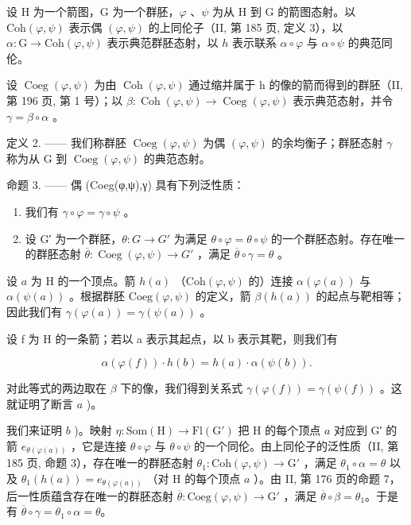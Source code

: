 设 H 为一个箭图，G 为一个群胚，\(\varphi\) 、\(\psi\) 为从 H 到 G 的箭图态射。以 \(\mathrm{Coh}(\varphi,\psi)\) 表示偶 \((\varphi,\psi)\) 的上同伦子（II, 第 185 页, 定义 3），以 \(\alpha\colon\mathrm{G}\to\mathrm{Coh}(\varphi,\psi)\) 表示典范群胚态射，以 \(h\) 表示联系 \(\alpha\circ\varphi\) 与 \(\alpha\circ\psi\) 的典范同伦。

设 \(\operatorname{Coeg}(\varphi,\psi)\) 为由 \(\operatorname{Coh}(\varphi,\psi)\) 通过缩并属于 h 的像的箭而得到的群胚（II, 第 196 页, 第 1 号）；以 \(\beta\colon\operatorname{Coh}(\varphi,\psi)\to\operatorname{Coeg}(\varphi,\psi)\) 表示典范态射，并令 \(\gamma=\beta\circ\alpha\) 。

定义 2. —— 我们称群胚 \(\operatorname{Coeg}(\varphi,\psi)\) 为偶 \((\varphi,\psi)\) 的余均衡子；群胚态射 \(\gamma\) 称为从 G 到 \(\operatorname{Coeg}(\varphi,\psi)\) 的典范态射。

命题 3. —— 偶 (Coeg(φ,ψ),γ) 具有下列泛性质：

\begin{enumerate}
\def\labelenumi{\alph{enumi})}
\item
  我们有 \(\gamma \circ \varphi = \gamma \circ \psi\) 。
\item
  设 G′ 为一个群胚，\(\theta\colon G\to G'\) 为满足 \(\theta\circ\varphi=\theta\circ\psi\) 的一个群胚态射。存在唯一的群胚态射 \(\overline{\theta}\colon\operatorname{Coeg}(\varphi,\psi)\to G'\) ，满足 \(\overline{\theta}\circ\gamma=\theta\) 。
\end{enumerate}

设 \(a\) 为 H 的一个顶点。箭 \(h(a)\) （\(\mathrm{Coh}(\varphi, \psi)\) 的）连接 \(\alpha(\varphi(a))\) 与 \(\alpha(\psi(a))\) 。根据群胚 \(\mathrm{Coeg}(\varphi, \psi)\) 的定义，箭 \(\beta(h(a))\) 的起点与靶相等；因此我们有 \(\gamma(\varphi(a)) = \gamma(\psi(a))\) 。

设 f 为 H 的一条箭；若以 a 表示其起点，以 b 表示其靶，则我们有

\[
\alpha (\varphi (f)) \cdot h (b) = h (a) \cdot \alpha (\psi (b)).
\]

对此等式的两边取在 \(\beta\) 下的像，我们得到关系式 \(\gamma(\varphi(f)) = \gamma(\psi(f))\) 。这就证明了断言 \(a\) )。

我们来证明 \(b\) )。映射 \(\eta\colon\mathrm{Som}(\mathrm{H})\to\mathrm{Fl}(\mathrm{G}')\) 把 H 的每个顶点 \(a\) 对应到 G′ 的箭 \(e_{\theta(\varphi(a))}\) ，它是连接 \(\theta\circ\varphi\) 与 \(\theta\circ\psi\) 的一个同伦。由上同伦子的泛性质（II, 第 185 页, 命题 3），存在唯一的群胚态射 \(\theta_1\colon\mathrm{Coh}(\varphi,\psi)\to\mathrm{G}'\) ，满足 \(\theta_1\circ\alpha=\theta\) 以及 \(\theta_1(h(a))=e_{\theta(\varphi(a))}\) （对 H 的每个顶点 \(a\) ）。由 II, 第 176 页的命题 7，后一性质蕴含存在唯一的群胚态射 \(\overline{\theta}\colon\mathrm{Coeg}(\varphi,\psi)\to\mathrm{G}'\) ，满足 \(\overline{\theta}\circ\beta=\theta_1\)。于是有 \(\overline{\theta}\circ\gamma=\theta_1\circ\alpha=\theta\)。

